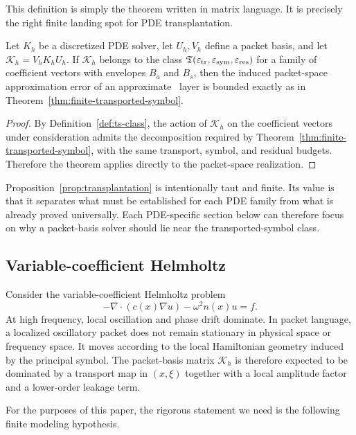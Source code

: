 This definition is simply the theorem written in matrix language. It is precisely the right finite landing spot for PDE transplantation.

\begin{proposition}
\label{prop:transplantation}
Let $K_h$ be a discretized PDE solver, let $U_h,V_h$ define a packet basis, and let $\mathcal K_h=V_hK_hU_h$. If $\mathcal K_h$ belongs to the class $\mathfrak T(\varepsilon_{\mathrm{tr}},\varepsilon_{\mathrm{sym}},\varepsilon_{\mathrm{res}})$ for a family of coefficient vectors with envelopes $B_a$ and $B_s$, then the induced packet-space approximation error of an approximate \MiNO\ layer is bounded exactly as in Theorem~\ref{thm:finite-transported-symbol}.
\end{proposition}

\begin{proof}
By Definition~\ref{def:ts-class}, the action of $\mathcal K_h$ on the coefficient vectors under consideration admits the decomposition required by Theorem~\ref{thm:finite-transported-symbol}, with the same transport, symbol, and residual budgets. Therefore the theorem applies directly to the packet-space realization.
\end{proof}

Proposition~\ref{prop:transplantation} is intentionally taut and finite. Its value is that it separates what must be established for each PDE family from what is already proved universally. Each PDE-specific section below can therefore focus on why a packet-basis solver should lie near the transported-symbol class.

\subsection{Variable-coefficient Helmholtz}

Consider the variable-coefficient Helmholtz problem
\[
 -\nabla\cdot(c(x)\nabla u) - \omega^2 n(x)u = f.
\]
At high frequency, local oscillation and phase drift dominate. In packet language, a localized oscillatory packet does not remain stationary in physical space or frequency space. It moves according to the local Hamiltonian geometry induced by the principal symbol. The packet-basis matrix $\mathcal K_h$ is therefore expected to be dominated by a transport map in $(x,\xi)$ together with a local amplitude factor and a lower-order leakage term.

For the purposes of this paper, the rigorous statement we need is the following finite modeling hypothesis.

